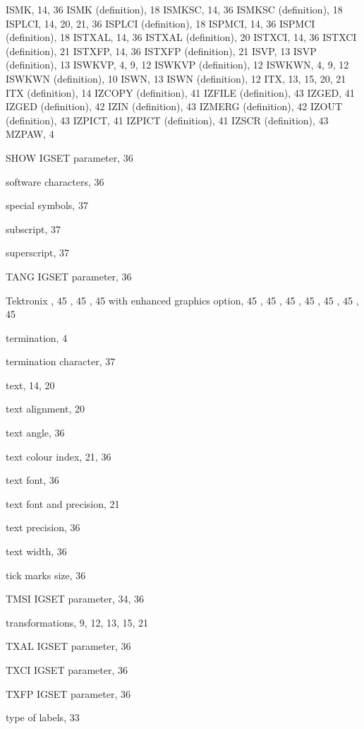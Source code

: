 \begin{theindex}
    \subitem ISMK, 14, 36
    \subitem ISMK (definition), 18
    \subitem ISMKSC, 14, 36
    \subitem ISMKSC (definition), 18
    \subitem ISPLCI, 14, 20, 21, 36
    \subitem ISPLCI (definition), 18
    \subitem ISPMCI, 14, 36
    \subitem ISPMCI (definition), 18
    \subitem ISTXAL, 14, 36
    \subitem ISTXAL (definition), 20
    \subitem ISTXCI, 14, 36
    \subitem ISTXCI (definition), 21
    \subitem ISTXFP, 14, 36
    \subitem ISTXFP (definition), 21
    \subitem ISVP, 13
    \subitem ISVP (definition), 13
    \subitem ISWKVP, 4, 9, 12
    \subitem ISWKVP (definition), 12
    \subitem ISWKWN, 4, 9, 12
    \subitem ISWKWN (definition), 10
    \subitem ISWN, 13
    \subitem ISWN (definition), 12
    \subitem ITX, 13, 15, 20, 21
    \subitem ITX (definition), 14
    \subitem IZCOPY (definition), 41
    \subitem IZFILE (definition), 43
    \subitem IZGED, 41
    \subitem IZGED (definition), 42
    \subitem IZIN (definition), 43
    \subitem IZMERG (definition), 42
    \subitem IZOUT (definition), 43
    \subitem IZPICT, 41
    \subitem IZPICT (definition), 41
    \subitem IZSCR (definition), 43
    \subitem MZPAW, 4
 
  \indexspace
 
  \item SHOW
    \subitem IGSET parameter, 36
  \item software characters, 36
  \item special symbols, 37
  \item subscript, 37
  \item superscript, 37
 
  \indexspace
 
  \item TANG
    \subitem IGSET parameter, 36
  \item Tektronix
    , 45
    , 45
    , 45
      \subsubitem with enhanced graphics option, 45
    , 45
    , 45
    , 45
    , 45
    , 45
    , 45
  \item termination, 4
  \item termination character, 37
  \item text, 14, 20
  \item text alignment, 20
  \item text angle, 36
  \item text colour index, 21, 36
  \item text font, 36
  \item text font and precision, 21
  \item text precision, 36
  \item text width, 36
  \item tick marks size, 36
  \item TMSI
    \subitem IGSET parameter, 34, 36
  \item transformations, 9, 12, 13, 15, 21
  \item TXAL
    \subitem IGSET parameter, 36
  \item TXCI
    \subitem IGSET parameter, 36
  \item TXFP
    \subitem IGSET parameter, 36
  \item type of labels, 33
 

\end{theindex}

